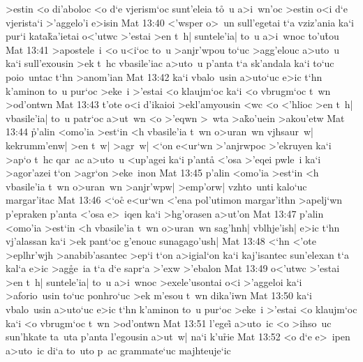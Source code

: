 >estin
<o
di'aboloc
<o
d`e
vjerism`oc
sunt'eleia
t\r{o}~u
a>i~wn'oc
>estin
o<i
d`e
vjerista`i
>'aggelo'i
e>isin\bibvsend
\vs Mat 13:40
<'wsper
o>~un
sull'egetai
t`a
vziz'ania
ka`i
pur`i
kata\r{k}a'ietai
o<'utwc
>'estai
>en
t~h|
suntele'ia|
to~u
a>i~wnoc
to'u\r{t}ou\bibvsend
{}
\vs Mat 13:41
>apostele~i
<o
u<i`oc
to~u
>anjr'wpou
to`uc
>agg'elouc
a>uto~u
ka`i
sull'exousin
>ek
t~hc
vbasile'iac
a>uto~u
p'anta
t`a
sk'andala
ka`i
to`uc
poio~untac
t`hn
>anom'ian\bibvsend
\vs Mat 13:42
ka`i
vbalo~usin
a>uto`uc
e>ic
t`hn
k'aminon
to~u
pur`oc
>eke~i
>'estai
<o
klaujm`oc
ka`i
<o
vbrugm`oc
t~wn
>od'ontwn\bibvsend
\vs Mat 13:43
t'ote
o<i
d'ikaioi
>ekl'amyousin
<wc
<o
<'hlioc
>en
t~h|
vbasile'ia|
to~u
patr`oc
a>ut~wn
<o
>'eqwn
>~wta
>a\r{k}o'uein
>akou'etw\bibvsend
\vs Mat 13:44
\r{p}'alin
<omo'ia
>est`in
<h
vbasile'ia
t~wn
o>uran~wn
vjhsaur~w|
kekrumm'enw|
>en
t~w|
>agr~w|
<`on
e<ur`wn
>'anjrwpoc
>'ekruyen
ka`i
>ap`o
t~hc
qar~ac
a>uto~u
<up'agei
ka`i
p'anta\r{}
<'osa
>'eqei
pwle~i
ka`i
>agor'azei
t`on
>agr`on
>eke~inon\bibvsend
\vs Mat 13:45
p'alin
<omo'ia
>est`in
<h
vbasile'ia
t~wn
o>uran~wn
>anjr'wpw|
>emp'orw|
vzhto~unti
kalo`uc
margar'itac\bibvsend
\vs Mat 13:46
<`oc\r{}
e<ur`wn
<'ena
pol'utimon
margar'ithn
>apelj`wn
p'epraken
p'anta
<'osa
e>~iqen
ka`i
>hg'orasen
a>ut'on\bibvsend
\vs Mat 13:47
p'alin
<omo'ia
>est`in
<h
vbasile'ia
t~wn
o>uran~wn
sag'hnh|
vblhje'ish|
e>ic
t`hn
vj'alassan
ka`i
>ek
pant`oc
g'enouc
sunagago'ush|\bibvsend
\vs Mat 13:48
<`hn
<'ote
>eplhr'wjh
>anabib'asantec
>ep`i
t`on
a>igial`on
ka`i
kaj'isantec
sun'elexan
t`a
kal`a
e>ic
>ag\r{g}e~ia
t`a
d`e
sapr`a
>'exw
>'ebalon\bibvsend
\vs Mat 13:49
o<'utwc
>'estai
>en
t~h|
suntele'ia|
to~u
a>i~wnoc
>exele'usontai
o<i
>'aggeloi
ka`i
>aforio~usin
to`uc
ponhro`uc
>ek
m'esou
t~wn
dika'iwn\bibvsend
\vs Mat 13:50
ka`i
vbalo~usin
a>uto`uc
e>ic
t`hn
k'aminon
to~u
pur`oc
>eke~i
>'estai
<o
klaujm`oc
ka`i
<o
vbrugm`oc
t~wn
>od'ontwn\bibvsend
\vs Mat 13:51
l'egei\r{}
a>uto~ic
<o
>ihso~uc
sun'hkate
ta~uta
p'anta
l'egousin
a>ut~w|
na`i
k'u\r{r}ie\bibvsend
{}
\vs Mat 13:52
<o
d`e
e>~ipen
a>uto~ic
di`a
to~uto
p~ac
grammate`uc
majhteuje`ic
